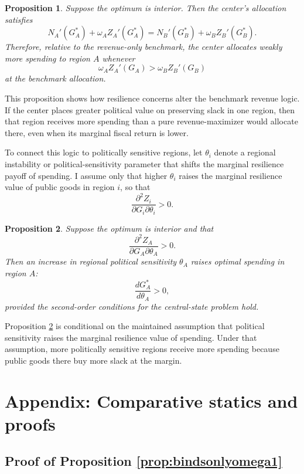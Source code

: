 \documentclass[12pt]{article}
\newtheorem{proposition}{Proposition}
\begin{document}
\begin{proposition}\label{prop:tworegion_resilience_shift}
Suppose the optimum is interior. Then the center's allocation satisfies
\[
N_A'(G_A^*) + \omega_A Z_A'(G_A^*)
=
N_B'(G_B^*) + \omega_B Z_B'(G_B^*).
\]
Therefore, relative to the revenue-only benchmark, the center allocates weakly more spending to region $A$ whenever
\[
\omega_A Z_A'(G_A) > \omega_B Z_B'(G_B)
\]
at the benchmark allocation.
\end{proposition}

This proposition shows how resilience concerns alter the benchmark revenue logic. If the center places greater political value on preserving slack in one region, then that region receives more spending than a pure revenue-maximizer would allocate there, even when its marginal fiscal return is lower.

To connect this logic to politically sensitive regions, let $\theta_i$ denote a regional instability or political-sensitivity parameter that shifts the marginal resilience payoff of spending. I assume only that higher $\theta_i$ raises the marginal resilience value of public goods in region $i$, so that
\[
\frac{\partial^2 Z_i}{\partial G_i\partial \theta_i} > 0.
\]

\begin{proposition}\label{prop:tworegion_instability}
Suppose the optimum is interior and that
\[
\frac{\partial^2 Z_A}{\partial G_A\partial \theta_A} > 0.
\]
Then an increase in regional political sensitivity $\theta_A$ raises optimal spending in region $A$:
\[
\frac{dG_A^*}{d\theta_A}>0,
\]
provided the second-order conditions for the central-state problem hold.
\end{proposition}

Proposition \ref{prop:tworegion_instability} is conditional on the maintained assumption that political sensitivity raises the marginal resilience value of spending. Under that assumption, more politically sensitive regions receive more spending because public goods there buy more slack at the margin.

\section*{Appendix: Comparative statics and proofs}


\subsection{Proof of Proposition \ref{prop:bindsonlyomega1}}
\end{document}
